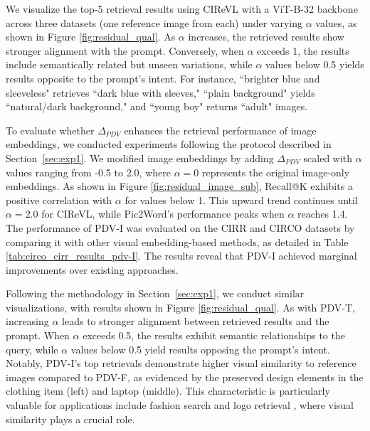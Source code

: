 We visualize the top-5 retrieval results using CIReVL with a ViT-B-32 backbone across three datasets (one reference image from each) under varying $\alpha$ values, as shown in Figure \ref{fig:residual_qual}. As $\alpha$ increases, the retrieved results show stronger alignment with the prompt. Conversely, when $\alpha$ exceeds 1, the results include semantically related but unseen variations, while $\alpha$ values below 0.5 yields results opposite to the prompt's intent. For instance, ``brighter blue and sleeveless" retrieves ``dark blue with sleeves," ``plain background" yields ``natural/dark background," and ``young boy" returns ``adult" images.





\label{sec:exp2}
To evaluate whether $\Delta_{PDV}$ enhances the retrieval performance of image embeddings, we conducted experiments following the protocol described in Section~\ref{sec:exp1}. We modified image embeddings by adding $\Delta_{PDV}$ scaled with $\alpha$ values ranging from -0.5 to 2.0, where $\alpha=0$ represents the original image-only embeddings. As shown in Figure \ref{fig:residual_image_sub}, Recall@K exhibits a positive correlation with $\alpha$ for values below 1. This upward trend continues until $\alpha=2.0$ for CIReVL, while Pic2Word's performance peaks when $\alpha$ reaches 1.4.  The performance of PDV-I was evaluated on the CIRR and CIRCO datasets by comparing it with other visual embedding-based methods, as detailed in Table \ref{tab:circo_cirr_results_pdv-I}. The results reveal that PDV-I achieved marginal improvements over existing approaches.

Following the methodology in Section~\ref{sec:exp1}, we conduct similar visualizations, with results shown in Figure \ref{fig:residual_qual}. As with PDV-T, increasing $\alpha$ leads to stronger alignment between retrieved results and the prompt. When $\alpha$ exceeds 0.5, the results exhibit semantic relationships to the query, while $\alpha$ values below 0.5 yield results opposing the prompt's intent.
Notably, PDV-I's top retrievals demonstrate higher visual similarity to reference images compared to PDV-F, as evidenced by the preserved design elements in the clothing item (left) and laptop (middle). This characteristic is particularly valuable for applications include fashion search \cite{wu2021fashion} and logo retrieval \cite{tursun2019component}, where visual similarity plays a crucial role.



